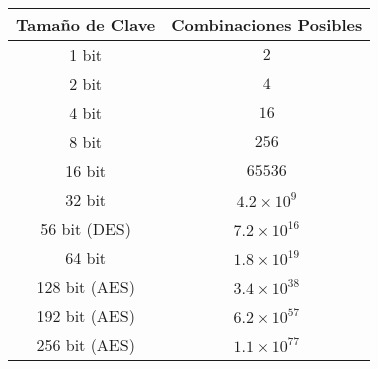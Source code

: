 \begin{tabular}{|c|c|}
  \hline
  \multicolumn{1}{|l|}{\textbf{Tamaño de Clave}} & \multicolumn{1}{l|}{\textbf{Combinaciones Posibles}} \\ \hline
  1 bit & $2$ \\ \hline
  2 bit & $4$ \\ \hline
  4 bit & $16$ \\ \hline
  8 bit & $256$ \\ \hline
  16 bit & $65536$ \\ \hline
  32 bit & $4.2\times10^{9}$ \\ \hline
  56 bit (DES) & $7.2\times10^{16}$ \\ \hline
  64 bit & $1.8\times10^{19}$ \\ \hline
  128 bit (AES) & $3.4\times10^{38}$ \\ \hline
  192 bit (AES) & $6.2\times10^{57}$ \\ \hline
  256 bit (AES) & $1.1\times10^{77}$ \\ \hline
  \end{tabular}